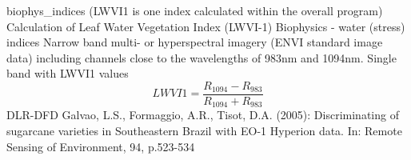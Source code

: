 %
{ %
biophys\_indices (LWVI1 is one index calculated within the overall program)
}
%
{ %
Calculation of Leaf Water Vegetation Index (LWVI-1)
}
%
{ %
Biophysics - water (stress) indices
}
%
{ %
Narrow band multi- or hyperspectral imagery (ENVI standard image data) including channels close to the wavelengths of 983nm and 1094nm.\bigskip
}
%
{ %
Single band with LWVI1 values
}
%
{ %
\begin{displaymath}
LWVI1 = \frac{R_{1094}-R_{983}}{R_{1094}+R_{983}}
\end{displaymath}
}
%
{ %
DLR-DFD
}
%
{ %
Galvao, L.S., Formaggio, A.R., Tisot, D.A. (2005): Discriminating of sugarcane varieties in Southeastern Brazil with EO-1 Hyperion data. In: Remote Sensing of Environment, 94, p.523-534
}

